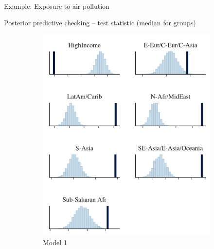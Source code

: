 \documentclass[t]{beamer}
\begin{document}
\begin{frame}

  {\Large\color{navyblue} Example: Exposure to air pollution}


  Posterior predictive checking -- test statistic (median for groups)

  \begin{figure}
\centering
\begin{subfigure}{.31\textwidth}
\includegraphics[width=\textwidth]{ppc_med_grouped1.png}
\caption{Model 1}
\end{subfigure}
~
\begin{subfigure}{.31\textwidth}

\end{subfigure}
\end{figure}
\end{frame}
\end{document}
